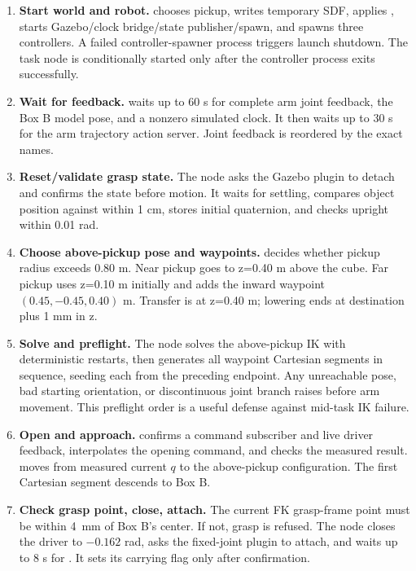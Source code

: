 \begin{enumerate}
 \item \textbf{Start world and robot.}  chooses
 pickup, writes temporary SDF, applies , starts
 Gazebo/clock bridge/state publisher/spawn, and spawns three controllers. A
 failed controller-spawner process triggers launch shutdown. The task node is
 conditionally started only after the controller process exits successfully.

 \item \textbf{Wait for feedback.}  waits up to 60 s for
 complete arm joint feedback, the Box B model pose, and a nonzero simulated
 clock. It then waits up to 30 s for the arm trajectory action server. Joint
 feedback is reordered by the exact  names.

 \item \textbf{Reset/validate grasp state.} The node asks the Gazebo plugin to
 detach and confirms the state before motion. It waits for settling, compares
 object position against  within 1 cm, stores initial
 quaternion, and checks upright within 0.01 rad.

 \item \textbf{Choose above-pickup pose and waypoints.}
  decides whether pickup radius
 exceeds 0.80 m. Near pickup goes to z=0.40 m above the cube. Far pickup uses
 z=0.10 m initially and adds the inward waypoint $(0.45,-0.45,0.40)$ m.
 Transfer is at z=0.40 m; lowering ends at destination plus 1 mm in z.

 \item \textbf{Solve and preflight.} The node solves the above-pickup IK with
 deterministic restarts, then generates all waypoint Cartesian segments in
 sequence, seeding each from the preceding endpoint. Any unreachable pose,
 bad starting orientation, or discontinuous joint branch raises before arm
 movement. This preflight order is a useful defense against mid-task IK failure.

 \item \textbf{Open and approach.}  confirms a command
 subscriber and live driver feedback, interpolates the opening command, and
 checks the measured result.  moves from measured current
 $q$ to the above-pickup configuration. The first Cartesian segment descends
 to Box B.

 \item \textbf{Check grasp point, close, attach.} The current FK grasp-frame
 point must be within \SI{4}{mm} of Box B's center. If not, grasp is refused.
 The node closes the driver to $-0.162$ rad, asks the fixed-joint plugin to
 attach, and waits up to 8 s for . It sets its carrying flag
 only after confirmation.


\end{enumerate}
